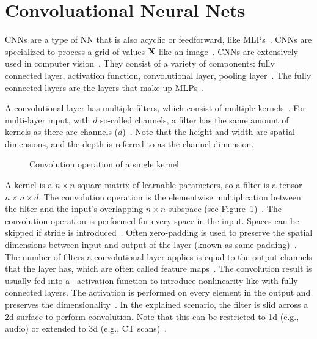 \section{Convoluational Neural Nets}\label{se:cnn}
\acp{CNN} are a type of \ac{NN} that is also acyclic or feedforward, like
\acp{MLP}~\citep{chauhan_review_2018}.
\acp{CNN} are specialized to process a grid of values $\textbf{X}$ like an image~\citep{goodfellow_deep_2016}.
\acp{CNN} are extensively used in computer vision~\citep{chauhan_review_2018}.
They consist of a variety of components: fully connected layer, activation function,
convolutional layer, pooling layer~\citep{chauhan_review_2018,ponti_everything_2017}.
The fully connected layers are the layers that make up \acp{MLP}~\citep{ponti_everything_2017}.

A convolutional layer has multiple filters, which consist of multiple
kernels~\citep{chauhan_review_2018}.
For multi-layer input, with $d$ so-called channels, a filter has the same amount of kernels as there
are channels ($d$)~\citep{ponti_everything_2017}.
Note that the height and width are spatial dimensions, and the depth is referred to
as the channel dimension.
\begin{figure}[h]
    \centering
    
    \caption[Visualization of a convolution operation]{%
        Convolution operation of a single kernel~\citep{chauhan_review_2018}\label{fig:conv-layer}
    }
\end{figure}
A kernel is a $n\times n$ square matrix of learnable parameters, so a filter is a tensor
$n\times n\times d$.
The convolution operation is the elementwise multiplication between the filter and the input's
overlapping $n\times n$ subspace (see Figure~\ref{fig:conv-layer})~\citep{ponti_everything_2017}.
The convolution operation is performed for every space in the input.
Spaces can be skipped if stride is introduced~\citep{ponti_everything_2017}.
Often zero-padding is used to preserve the spatial dimensions between input and output of
the layer (known as same-padding)~\citep{ponti_everything_2017,simonyan_very_2015}.
The number of filters a convolutional layer applies is equal to the output channels that the layer
has, which are often called feature maps~\citep{ponti_everything_2017}.
The convolution result is usually fed into a \relu\ activation function to introduce
nonlinearity like with fully connected layers.
The activation is performed on every element in the output and preserves the
dimensionality~\citep{ponti_everything_2017}.
In the explained scenario, the filter is slid across a 2d-surface to perform convolution.
Note that this can be restricted to 1d (e.g., audio) or extended to 3d (e.g., CT
scans)~\citep{goodfellow_deep_2016}.

